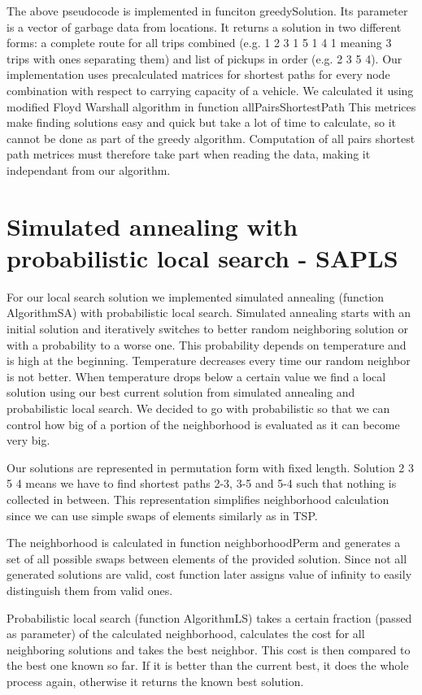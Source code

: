 \documentclass[a4paper, 12pt]{article}
\begin{document}
The above pseudocode is implemented in funciton {\sf greedySolution}. Its
parameter is a vector of garbage data from locations. It returns a solution in
two different forms: a complete route for all trips combined (e.g. 1 2 3 1 5 1
4 1 meaning 3 trips with ones separating them) and list of pickups in order
(e.g. 2 3 5 4). Our implementation uses precalculated matrices for shortest
paths for every node combination with respect to carrying capacity of a
vehicle. We calculated it using modified Floyd Warshall algorithm in function
{\sf allPairsShortestPath} This metrices make finding solutions easy and
quick but take a lot of time to calculate, so it cannot be done as part of the
greedy algorithm. Computation of all pairs shortest path metrices must
therefore take part when reading the data, making it independant from our
algorithm.

\section{Simulated annealing with probabilistic local search - SAPLS}

For our local search solution we implemented simulated annealing (function {\sf
AlgorithmSA}) with probabilistic local search. Simulated annealing starts with
an initial solution and iteratively switches to better random neighboring
solution or with a probability to a worse one. This probability depends on
temperature and is high at the beginning. Temperature decreases every time our
random neighbor is not better. When temperature drops below a certain value we
find a local solution using our best current solution from simulated annealing
and probabilistic local search. We decided to go with probabilistic so that we
can control how big of a portion of the neighborhood is evaluated as it can
become very big.

Our solutions are represented in permutation form with fixed length. Solution
2 3 5 4 means we have to find shortest paths 2-3, 3-5 and 5-4 such that nothing
is collected in between. This representation simplifies neighborhood
calculation since we can use simple swaps of elements similarly as in TSP.

The neighborhood is calculated in function {\sf neighborhoodPerm} and generates
a set of all possible swaps between elements of the provided solution. Since
not all generated solutions are valid, cost function later assigns value of
infinity to easily distinguish them from valid ones.

Probabilistic local search (function {\sf AlgorithmLS}) takes a certain
fraction (passed as parameter) of the calculated neighborhood, calculates
the cost for all neighboring solutions and takes the best neighbor. This cost
is then compared to the best one known so far. If it is better than the current
best, it does the whole process again, otherwise it returns the known best
solution.
\end{document}

